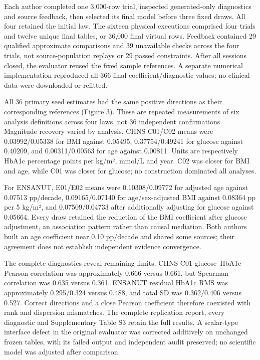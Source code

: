 \documentclass[11pt,letterpaper]{article}
\begin{document}
Each author completed one 3,000-row trial, inspected generated-only diagnostics and source feedback, then selected its final model before three fixed draws. All four retained the initial law. The sixteen physical executions comprised four trials and twelve unique final tables, or 36,000 final virtual rows. Feedback contained 29 qualified approximate comparisons and 39 unavailable checks across the four trials, not source-population replays or 29 passed constraints. After all sessions closed, the evaluator reused the fixed sample references. A separate numerical implementation reproduced all 366 final coefficient/\allowbreak{}diagnostic values; no clinical data were downloaded or refitted.


All 36 primary seed estimates had the same positive directions as their corresponding references (Figure 3). These are repeated measurements of six analysis definitions across four laws, not 36 independent confirmations. Magnitude recovery varied by analysis. CHNS C01/\allowbreak{}C02 means were 0.03992/\allowbreak{}0.05338 for BMI against 0.05495, 0.37754/\allowbreak{}0.49241 for glucose against 0.40209, and 0.00311/\allowbreak{}0.00563 for age against 0.00811. Units are respectively HbA1c percentage points per kg/\allowbreak{}m², mmol/\allowbreak{}L and year. C02 was closer for BMI and age, while C01 was closer for glucose; no construction dominated all analyses.


For ENSANUT, E01/\allowbreak{}E02 means were 0.10308/\allowbreak{}0.09772 for adjusted age against 0.07513 pp/\allowbreak{}decade, 0.09165/\allowbreak{}0.07140 for age/\allowbreak{}sex-adjusted BMI against 0.08364 pp per 5 kg/\allowbreak{}m², and 0.07509/\allowbreak{}0.04733 after additionally adjusting for glucose against 0.05664. Every draw retained the reduction of the BMI coefficient after glucose adjustment, an association pattern rather than causal mediation. Both authors built an age coefficient near 0.10 pp/\allowbreak{}decade and shared some sources; their agreement does not establish independent evidence convergence.


The complete diagnostics reveal remaining limits. CHNS C01 glucose–\allowbreak{}HbA1c Pearson correlation was approximately 0.666 versus 0.661, but Spearman correlation was 0.635 versus 0.361. ENSANUT residual HbA1c RMS was approximately 0.295/\allowbreak{}0.324 versus 0.488, and total SD was 0.362/\allowbreak{}0.406 versus 0.527. Correct directions and a close Pearson coefficient therefore coexisted with rank and dispersion mismatches. The complete replication report, every diagnostic and Supplementary Table S3 retain the full results. A scalar-type interface defect in the original evaluator was corrected additively on unchanged frozen tables, with its failed output and independent audit preserved; no scientific model was adjusted after comparison.
\end{document}

